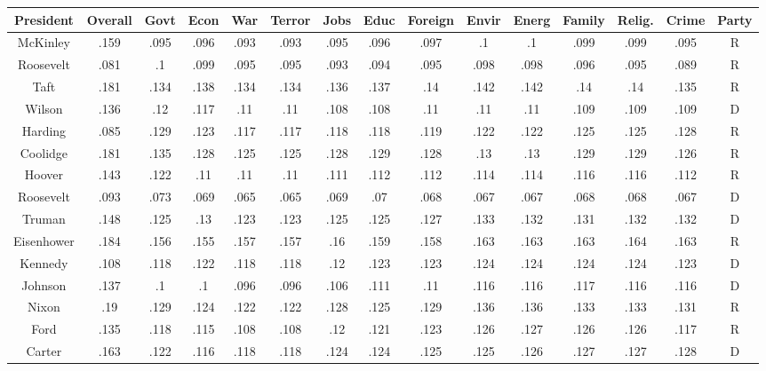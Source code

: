 \begin{sidewaystable}
\begin{singlespace}
\begin{center}
 \begin{tabular}{||c c c c c c c c c c c c c c c||}
 \hline
 President & Overall & Govt & Econ & War & Terror & Jobs & Educ & Foreign & Envir & Energ & Family & Relig. & Crime & Party\\
 \hline\hline
  McKinley & .159 & .095 & .096 & .093 & .093 & .095 & .096 & .097 & .1 & .1 & .099 & .099 & .095 & R \\ 
\hline
Roosevelt & .081 & .1 & .099 & .095 & .095 & .093 & .094 & .095 & .098 & .098 & .096 & .095 & .089 & R \\ 
\hline
Taft & .181 & .134 & .138 & .134 & .134 & .136 & .137 & .14 & .142 & .142 & .14 & .14 & .135 & R \\ 
\hline
Wilson & .136 & .12 & .117 & .11 & .11 & .108 & .108 & .11 & .11 & .11 & .109 & .109 & .109 & D \\ 
\hline
Harding & .085 & .129 & .123 & .117 & .117 & .118 & .118 & .119 & .122 & .122 & .125 & .125 & .128 & R \\ 
\hline
Coolidge & .181 & .135 & .128 & .125 & .125 & .128 & .129 & .128 & .13 & .13 & .129 & .129 & .126 & R \\ 
\hline
Hoover & .143 & .122 & .11 & .11 & .11 & .111 & .112 & .112 & .114 & .114 & .116 & .116 & .112 & R \\ 
\hline
Roosevelt & .093 & .073 & .069 & .065 & .065 & .069 & .07 & .068 & .067 & .067 & .068 & .068 & .067 & D \\ 
\hline
Truman & .148 & .125 & .13 & .123 & .123 & .125 & .125 & .127 & .133 & .132 & .131 & .132 & .132 & D \\ 
\hline
Eisenhower & .184 & .156 & .155 & .157 & .157 & .16 & .159 & .158 & .163 & .163 & .163 & .164 & .163 & R \\ 
\hline
Kennedy & .108 & .118 & .122 & .118 & .118 & .12 & .123 & .123 & .124 & .124 & .124 & .124 & .123 & D \\ 
\hline
Johnson & .137 & .1 & .1 & .096 & .096 & .106 & .111 & .11 & .116 & .116 & .117 & .116 & .116 & D \\ 
\hline
Nixon & .19 & .129 & .124 & .122 & .122 & .128 & .125 & .129 & .136 & .136 & .133 & .133 & .131 & R \\ 
\hline
Ford & .135 & .118 & .115 & .108 & .108 & .12 & .121 & .123 & .126 & .127 & .126 & .126 & .117 & R \\ 
\hline
Carter & .163 & .122 & .116 & .118 & .118 & .124 & .124 & .125 & .125 & .126 & .127 & .127 & .128 & D \\ 

\end{tabular}
\end{center}
\end{singlespace}
\end{sidewaystable}

